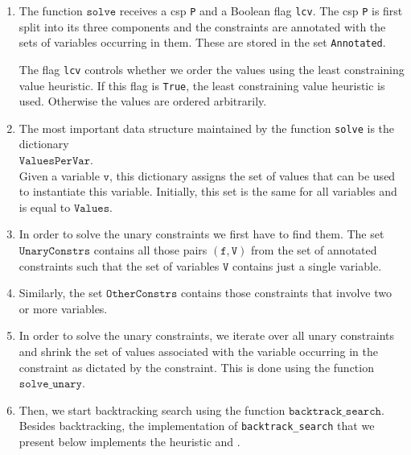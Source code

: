 \begin{enumerate}
\item The function $\texttt{solve}$ receives a \ac{csp} \texttt{P} and a Boolean flag \texttt{lcv}.  
      The \ac{csp} \texttt{P} is first split into its
      three components and the constraints are annotated with the sets of variables occurring in them.
      These  are stored in the set \texttt{Annotated}.

      The flag \texttt{lcv} controls whether we order the values using the least constraining value heuristic.
      If this flag is \texttt{True}, the least constraining value heuristic is used.  Otherwise the values
      are ordered arbitrarily.
\item The most important data structure maintained by the function \texttt{solve} is the dictionary
      \\[0.2cm]
      \hspace*{1.3cm}
      $\texttt{ValuesPerVar}$.  
      \\[0.2cm]
      Given a variable $\texttt{v}$, this dictionary assigns the set of values that can be used to instantiate this
      variable.  Initially, this set is the same for all variables and is equal to $\texttt{Values}$.
\item In order to solve the unary constraints we first have to find them.
      The set $\texttt{UnaryConstrs}$ contains all those pairs $(\texttt{f}, \texttt{V})$ from the set of
      annotated constraints such that the set of variables $\texttt{V}$ contains just a
      single variable. 
\item Similarly, the set $\texttt{OtherConstrs}$ contains those constraints that involve two or more variables.
\item In order to solve the unary constraints, we iterate over all unary constraints and shrink the set of
      values associated with the variable occurring in the constraint as dictated by the constraint.
      This is done using the function $\texttt{solve\_unary}$.
\item Then, we start backtracking search using the function $\texttt{backtrack\_search}$.  
      Besides backtracking, the implementation of \texttt{backtrack\_search} that we present below
      implements the  heuristic and .
\end{enumerate}

